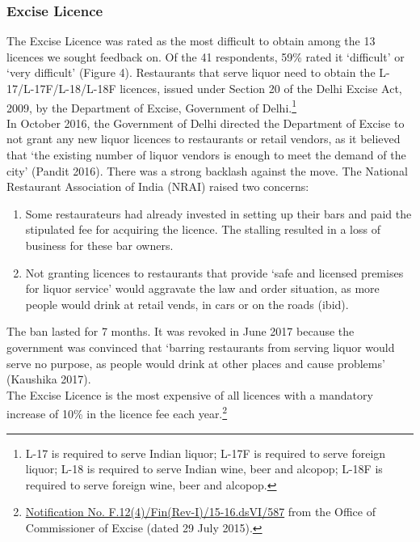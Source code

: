 \documentclass[a4paper, 12pt]{article}
\begin{document}
		
		\subsubsection{Excise Licence}
		The Excise Licence was rated as the most difficult to obtain among the 13 licences we sought feedback on. Of the 41 respondents, 59\% rated it ‘difficult’ or ‘very difficult’ (Figure 4). Restaurants that serve liquor need to obtain the L-17/L-17F/L-18/L-18F licences, issued under Section 20 of the Delhi Excise Act, 2009, by the Department of Excise, Government of Delhi.\footnote{L-17 is required to serve Indian liquor; L-17F is required to serve foreign liquor; L-18 is required to serve Indian wine, beer and alcopop; L-18F is required to serve foreign wine, beer and alcopop.}\\%
		In October 2016, the Government of Delhi directed the Department of Excise to not grant any new liquor licences to restaurants or retail vendors, as it believed that ‘the existing number of liquor vendors is enough to meet the demand of the city’ (Pandit 2016). There was a strong backlash against the move. The National Restaurant Association of India (NRAI) raised two concerns:\\
		
		\begin {enumerate}
			\item Some restaurateurs had already invested in setting up their bars and paid the stipulated fee for acquiring the licence. The stalling resulted in a loss of business for these bar owners.\\
			\item Not granting licences to restaurants that provide ‘safe and licensed premises for liquor service’ would aggravate the law and order situation, as more people would drink at retail vends, in cars or on the roads (ibid).\\
		\end {enumerate}
		
		The ban lasted for 7 months. It was revoked in June 2017 because the government was convinced that ‘barring restaurants from serving liquor would serve no purpose, as people would drink at other places and cause problems’ (Kaushika 2017).\\
		The Excise Licence is the most expensive of all licences with a mandatory increase of 10\% in the licence fee each year.\footnote{\href{https://bit.ly/2xoejoG}{Notification No. F.12(4)/Fin(Rev-I)/15-16.dsVI/587} from the Office of Commissioner of Excise (dated 29 July 2015).} %
		
\end{document}
